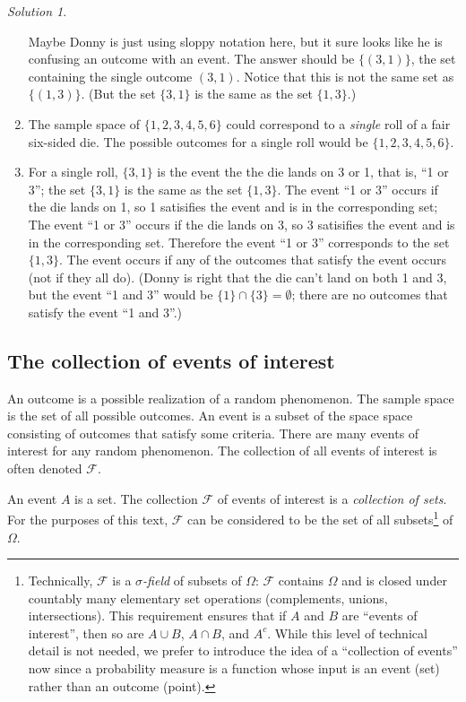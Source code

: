 \documentclass[
  letterpaper,
  DIV=11,
  numbers=noendperiod]{scrreprt}
\theoremstyle{plain}
\theoremstyle{definition}
\theoremstyle{definition}
\theoremstyle{definition}
\theoremstyle{remark}
\newtheorem{refsolution}{Solution}[chapter]
\begin{document}
\begin{tcolorbox}
\begin{refsolution}
\begin{enumerate}
  Maybe Donny is just using sloppy notation here, but it sure looks like
  he is confusing an outcome with an event. The answer should be
  \(\{(3, 1)\}\), the set containing the single outcome \((3, 1)\).
  Notice that this is not the same set as \(\{(1, 3)\}\). (But the set
  \(\{3, 1\}\) is the same as the set \(\{1, 3\}\).)
\item
  The sample space of \(\{1, 2, 3, 4, 5, 6\}\) could correspond to a
  \emph{single} roll of a fair six-sided die. The possible outcomes for
  a single roll would be \(\{1, 2, 3, 4, 5, 6\}\).
\item
  For a single roll, \(\{3, 1\}\) is the event the the die lands on 3 or
  1, that is, ``1 or 3''; the set \(\{3, 1\}\) is the same as the set
  \(\{1, 3\}\). The event ``1 or 3'' occurs if the die lands on 1, so 1
  satisifies the event and is in the corresponding set; The event ``1 or
  3'' occurs if the die lands on 3, so 3 satisifies the event and is in
  the corresponding set. Therefore the event ``1 or 3'' corresponds to
  the set \(\{1, 3\}\). The event occurs if any of the outcomes that
  satisfy the event occurs (not if they all do). (Donny is right that
  the die can't land on both 1 and 3, but the event ``1 and 3'' would be
  \(\{1\}\cap \{3\}=\emptyset\); there are no outcomes that satisfy the
  event ``1 and 3''.)
\end{enumerate}

\label{sol-dd-event}

\end{refsolution}

\end{tcolorbox}

\subsection{The collection of events of interest}\label{sec-sigmafield}

An outcome is a possible realization of a random phenomenon. The sample
space is the set of all possible outcomes. An event is a subset of the
space space consisting of outcomes that satisfy some criteria. There are
many events of interest for any random phenomenon. The collection of all
events of interest is often denoted \(\mathcal{F}\).

An event \(A\) is a set. The collection \(\mathcal{F}\) of events of
interest is a \emph{collection of sets}. For the purposes of this text,
\(\mathcal{F}\) can be considered to be the set of all
subsets\footnote{Technically, \(\mathcal{F}\) is a
  \emph{\(\sigma\)-field} of subsets of \(\Omega\): \(\mathcal{F}\)
  contains \(\Omega\) and is closed under countably many elementary set
  operations (complements, unions, intersections). This requirement
  ensures that if \(A\) and \(B\) are ``events of interest'', then so
  are \(A\cup B\), \(A\cap B\), and \(A^c\). While this level of
  technical detail is not needed, we prefer to introduce the idea of a
  ``collection of events'' now since a probability measure is a function
  whose input is an event (set) rather than an outcome (point).} of
\(\Omega\).
\end{document}
